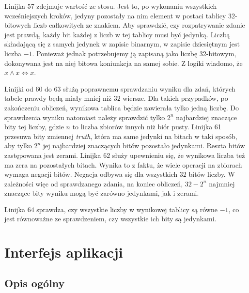 \documentclass{SGGW-thesis}
\begin{document}
\begin{paragraph}{}
    Linijka 57 zdejmuje wartość ze stosu. Jest to, po wykonaniu wszystkich wcześniejszych kroków, jedyny pozostały na nim element w postaci tablicy 32-bitowych liczb całkowitych ze znakiem. Aby sprawdzić, czy rozpatrywanie zdanie jest prawdą, każdy bit każdej z liczb w tej tablicy musi być jedynką. Liczbą składającą się z samych jedynek w zapisie binarnym, w zapisie dziesiętnym jest liczba $-1$. Ponieważ jednak potrzebujemy ją zapisaną jako liczbę 32-bitowym, dokonywana jest na niej bitowa koniunkcja na samej sobie. Z logiki wiadomo, że $x \wedge x \iff x$. 

    Linijki od 60 do 63 służą poprawnemu sprawdzaniu wyniku dla zdań, których tabele prawdy będą miały mniej niż $32$ wiersze. Dla takich przypadków, po zakończeniu obliczeń, wynikowa tablica będzie zawierała tylko jedną liczbę. Do sprawdzenia wyniku natomiast należy sprawdzić tylko $2^{n}$ najbardziej znaczące bity tej liczby, gdzie $n$ to liczba zbiorów innych niż biór pusty. Linijka 61 przesuwa bity zmiennej \emph{truth}, która ma same jedynki na bitach w taki sposób, aby tylko $2^{n}$ jej najbardziej znaczących bitów pozostało jedynkami. Reszta bitów zastępowana jest zerami. Linijka 62 służy upewnieniu się, że wynikowa liczba też ma zera na pozostałych bitach. Wynika to z faktu, że wiele operacji na zbiorach wymaga negacji bitów. Negacja odbywa się dla wszystkich 32 bitów liczby. W zależności więc od sprawdzanego zdania, na koniec obliczeń, $32-2^{n}$ najmniej znaczące bity wyniku mogą być zarówno jedynkami, jak i zerami.

    Linijka 64 sprawdza, czy wszystkie liczby w wynikowej tablicy są równe $-1$, co jest równoważne ze sprawdzeniem, czy wszystkie ich bity są jedynkami.
\end{paragraph}

\chapter{Interfejs aplikacji}

\section{Opis ogólny}
\end{document}
